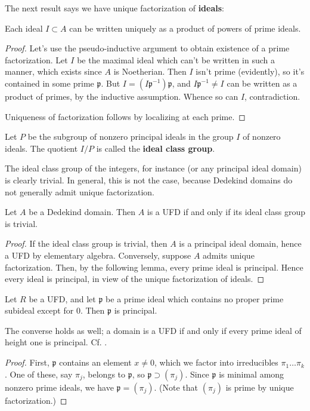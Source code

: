 The next result says we have unique factorization of \textbf{ideals}:
\begin{theorem}[Factorization] Each ideal $I \subset A$ can be written uniquely as a product of powers of prime ideals.
\end{theorem}
\begin{proof}
Let's use the pseudo-inductive argument to obtain existence of a prime factorization.  Let $I$ be the maximal ideal which can't be written in such a manner, which exists since $A$ is Noetherian.  Then $I$ isn't prime (evidently), so it's contained in some prime $\mathfrak{p}$.  But $I = (I\mathfrak{p}^{-1})\mathfrak{p}$, and $I\mathfrak{p}^{-1} \neq I$ can be written as a product of primes, by the inductive assumption. Whence so can $I$, contradiction.

Uniqueness of factorization follows by localizing at each prime.
\end{proof}

\begin{definition} Let $P$ be the subgroup of nonzero principal ideals in the group $I$ of nonzero ideals.  The quotient $I/P$ is called the \textbf{ideal class group}.
\end{definition}

The ideal class group of the integers, for instance (or any principal ideal domain) is clearly trivial.  In general, this is not the case, because Dedekind domains do not generally admit unique factorization.
\begin{proposition} Let $A$ be a Dedekind domain. Then $A$ is a UFD if and only if its ideal class group is trivial.
\end{proposition}
\begin{proof} If the ideal class group is trivial, then $A$ is a principal ideal domain, hence a UFD by elementary algebra.  Conversely, suppose $A$ admits unique factorization.  
Then, by the following lemma, every prime ideal is principal.  Hence every ideal is principal, in view of the unique factorization of ideals.
\end{proof}
\begin{lemma} Let $R$ be a UFD, and let $\mathfrak{p}$ be a prime ideal which contains no proper prime subideal except for $0$.  Then $\mathfrak{p}$ is principal.
\end{lemma}
The converse holds as well; a domain is a UFD if and only if every prime ideal
of height one is principal.  Cf. \cite{Ei95}.
\begin{proof}
First, $\mathfrak{p}$ contains an element $x \neq 0$, which we factor into irreducibles $\pi_1 \dots \pi_k$.  One of these, say $\pi_j$, belongs to $\mathfrak{p}$, so $\mathfrak{p} \supset (\pi_j)$. Since $\mathfrak{p}$ is minimal among nonzero prime ideals, we have $\mathfrak{p} = (\pi_j)$.  (Note that $(\pi_j)$ is prime by unique factorization.)
\end{proof}

